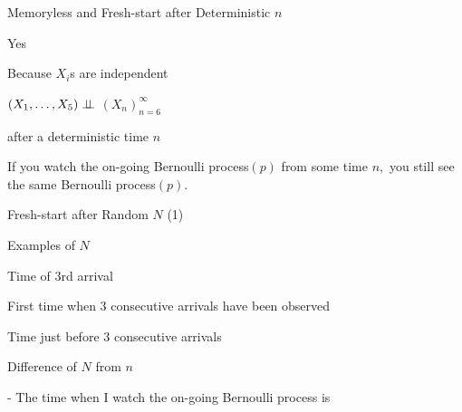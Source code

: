 \documentclass[fleqn,aspectratio=169]{beamer}
\begin{document}
\begin{frame}{Memoryless and Fresh-start after Deterministic $n$}

\plitemsep 0.1in

\bci
\item<2-> Yes

\item<2-> Because $X_i$s are independent

\eci

\bigskip
{}
\bci
\item<4-> $(X_1, \ldots, X_5) \perp \!\!\! \perp$  $(X_n)_{n=6}^\infty$
\item<5->  after a deterministic time $n$
\item<6-> If you watch the on-going Bernoulli process$(p)$ from some time $n,$ you still see the same Bernoulli process$(p).$
\eci

\end{frame}
\begin{frame}{Fresh-start after Random $N$ (1)}

 
\plitemsep 0.1in
\bci
\item<2-> Examples of $N$
{
\small
\bce[\bf E1.]
\item<3-> Time of 3rd arrival
\item<4-> First time when 3 consecutive arrivals have been observed
\item<5-> Time just before 3 consecutive arrivals
\ece
}
{
\vspace{-1cm}
\centering
{}
}

\item<6-> Difference of $N$ from $n$

- The time when I watch the on-going Bernoulli process is  

\eci

\end{frame}
\end{document}
